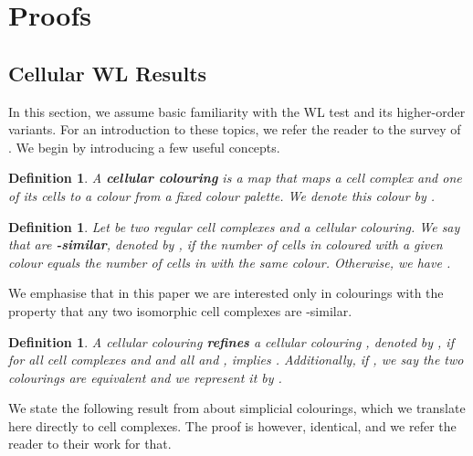 \documentclass{article}
\newtheorem{definition}[theorem]{Definition}
\begin{document}





















\newpage 

\appendix

\section{Proofs}
\label{app:proofs_cellular}
\subsection{Cellular WL Results}

In this section, we assume basic familiarity with the WL test and its higher-order variants. For an introduction to these topics, we refer the reader to the survey of \citet{sato2020survey}. We begin by introducing a few useful concepts. 

\begin{definition}
A \textbf{cellular colouring} is a map  that maps a cell complex  and one of its cells  to a colour from a fixed colour palette. We denote this colour by . 
\end{definition}

\begin{definition}
Let  be two regular cell complexes and  a cellular colouring. We say that  are \textbf{-similar}, denoted by , if the number of cells in  coloured with a given colour equals the number of cells in  with the same colour. Otherwise, we have .  
\end{definition}

We emphasise that in this paper we are interested only in colourings  with the property that any two isomorphic cell complexes are -similar. 

\begin{definition}
A cellular colouring  \textbf{refines} a cellular colouring , denoted by , if for all cell complexes  and 
and all  and ,  implies . Additionally, if , we say the two colourings are equivalent and we represent it by . 
\end{definition}

We state the following result from \citet{bodnar2021weisfeiler} about simplicial colourings, which we translate here directly to cell complexes. The proof is however, identical, and we refer the reader to their work for that. 
\end{document}
